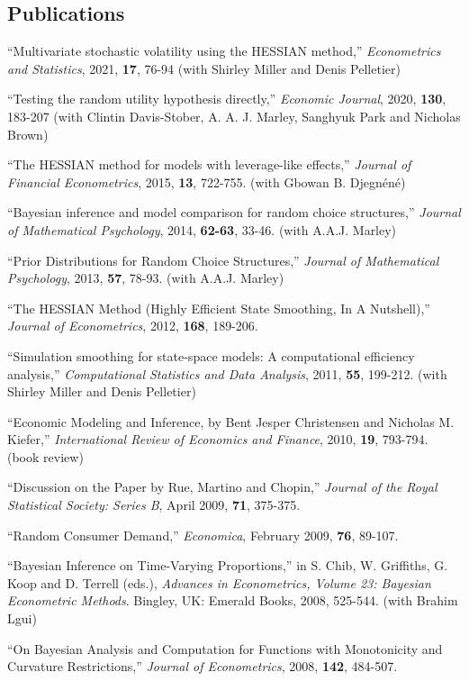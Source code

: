 \documentclass[12pt]{article}
\begin{document}
\subsection*{Publications}

``Multivariate stochastic volatility using the HESSIAN method,''
{\it Econometrics and Statistics}, 2021,
{\bf 17}, 76-94
(with Shirley Miller and Denis Pelletier)

``Testing the random utility hypothesis directly,''
{\it Economic Journal}, 2020,
{\bf 130}, 183-207
(with Clintin Davis-Stober, A. A. J. Marley, Sanghyuk Park and Nicholas Brown)

``The HESSIAN method for models with leverage-like effects,''
{\it Journal of Financial Econometrics}, 2015,
{\bf 13}, 722-755.
(with Gbowan B. Djegn\'en\'e)

``Bayesian inference and model comparison for random choice structures,''
{\it Journal of Mathematical Psychology}, 2014,
{\bf 62-63}, 33-46.
(with A.A.J. Marley)

``Prior Distributions for Random Choice Structures,''
{\it Journal of Mathematical Psychology}, 2013,
{\bf 57}, 78-93.
(with A.A.J. Marley)

``The HESSIAN Method (Highly Efficient State Smoothing, In A Nutshell),''
{\it Journal of Econometrics}, 2012,
{\bf 168}, 189-206.

``Simulation smoothing for state-space models: A computational efficiency analysis,''
{\it Computational Statistics and Data Analysis}, 2011,
{\bf 55}, 199-212.
(with Shirley Miller and Denis Pelletier)

``Economic Modeling and Inference, by Bent Jesper Christensen and Nicholas M. Kiefer,''
{\it International Review of Economics and Finance}, 2010,
{\bf 19}, 793-794.
(book review)

``Discussion on the Paper by Rue, Martino and Chopin,''
{\it Journal of the Royal Statistical Society: Series B}, April 2009,
{\bf 71}, 375-375.

``Random Consumer Demand,'' {\it Economica}, February 2009,
{\bf 76}, 89-107.
 
``Bayesian Inference on Time-Varying Proportions,'' in S. Chib, W. Griffiths, G. Koop and D. Terrell (eds.),
{\it Advances in Econometrics, Volume 23: Bayesian Econometric Methods}.
Bingley, UK: Emerald Books, 2008, 525-544.
(with Brahim Lgui)

``On Bayesian Analysis and Computation for Functions with Monotonicity and Curvature Restrictions,''  {\it Journal of Econometrics}, 2008,
{\bf 142}, 484-507.
\end{document}
